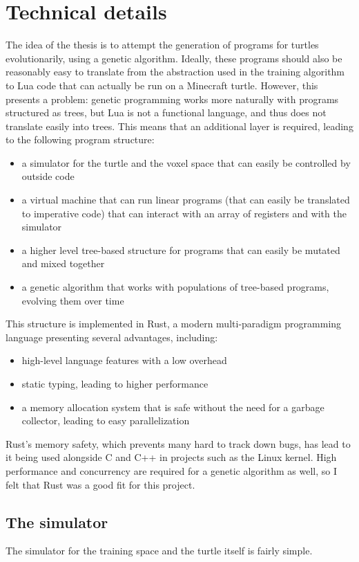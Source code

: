 \documentclass{report}
\begin{document}
\chapter{Technical details}
The idea of the thesis is to attempt the generation of programs for turtles evolutionarily, using a genetic algorithm. Ideally, these programs should also be reasonably easy to translate from the abstraction used in the training algorithm to Lua code that can actually be run on a Minecraft turtle. However, this presents a problem: genetic programming works more naturally with programs structured as trees, but Lua is not a functional language, and thus does not translate easily into trees. This means that an additional layer is required, leading to the following program structure:

\begin{itemize}
    \item a simulator for the turtle and the voxel space that can easily be controlled by outside code
    \item a virtual machine that can run linear programs (that can easily be translated to imperative code) that can interact with an array of registers and with the simulator
    \item a higher level tree-based structure for programs that can easily be mutated and mixed together
    \item a genetic algorithm that works with populations of tree-based programs, evolving them over time
\end{itemize}

This structure is implemented in Rust, a modern multi-paradigm programming language presenting several advantages, including:
\begin{itemize}
    \item high-level language features with a low overhead
    \item static typing, leading to higher performance
    \item a memory allocation system that is safe without the need for a garbage collector, leading to easy parallelization
\end{itemize}
Rust's memory safety, which prevents many hard to track down bugs, has lead to it being used alongside C and C++ in projects such as the Linux kernel. High performance and concurrency are required for a genetic algorithm as well, so I felt that Rust was a good fit for this project.

\section{The simulator}
The simulator for the training space and the turtle itself is fairly simple.
\end{document}
